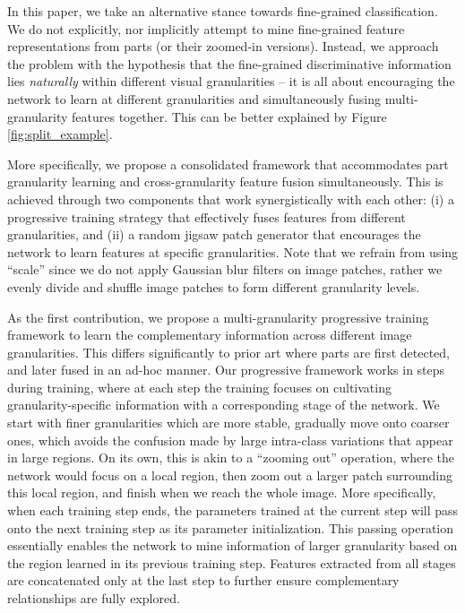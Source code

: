 \documentclass{llncs}
\begin{document}
In this paper, we take an alternative stance towards fine-grained classification. We do not explicitly, nor implicitly attempt to mine fine-grained feature representations from parts (or their zoomed-in versions). Instead, we approach the problem with the hypothesis that the fine-grained discriminative information lies \textit{naturally} within different visual granularities -- it is all about encouraging the network to learn at different granularities and simultaneously fusing multi-granularity features together. This can be better explained by Figure \ref{fig:split_example}.

More specifically, we propose a consolidated framework that accommodates part granularity learning and cross-granularity feature fusion simultaneously. This is achieved through two components that  work synergistically with each other: (i) a progressive training strategy that effectively fuses features from different granularities, and (ii) a random jigsaw patch generator that encourages the network to learn features at specific granularities. Note that we refrain from using ``scale'' since we do not apply Gaussian blur filters on image patches, rather we evenly divide and shuffle image patches to form different granularity levels.



As the first contribution, we propose a multi-granularity progressive training framework to learn the complementary information across different image granularities. This differs significantly to prior art where parts are first detected, and later fused in an ad-hoc manner. Our progressive framework works in steps during training, where at each step the training focuses on cultivating granularity-specific information with a corresponding stage of the network. We start with finer granularities which are more stable, gradually move onto coarser ones, which avoids the confusion made by large intra-class variations that appear in large regions. On its own, this is akin to a ``zooming out'' operation, where the network would focus on a local region, then zoom out a larger patch surrounding this local region, and finish when we reach the whole image. More specifically, when each training step ends, the parameters trained at the current step will pass onto the next  training step as its parameter initialization. This passing operation essentially enables the network to mine information of larger granularity based on the region learned in its previous training step. Features extracted from all stages are concatenated only at the last step to further ensure complementary relationships are fully explored. 
\end{document}
